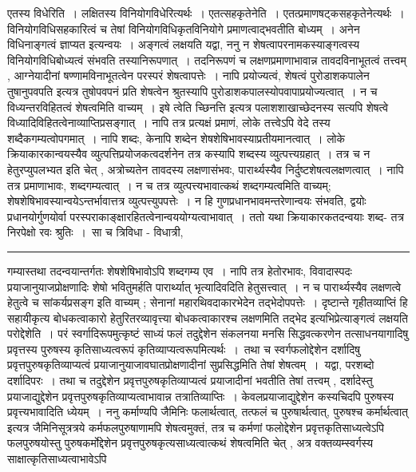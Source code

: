 \documentclass[11pt, openany]{book}
\begin{document}
 {\br एतस्य विधेरिति~।}  लक्षितस्य विनियोगविधेरित्यर्थः~। {\br एतत्सहकृतेनेति~।}  एतत्प्रमाणषट्कसहकृतेनेत्यर्थः~। विनियोगविधिसहकारित्वं च तेषां
विनियोगविधिकृतविनियोगे प्रमाणत्वाद्भवतीति बोध्यम्~। अनेन विधिनाङ्गत्वं ज्ञाप्यत इत्यन्वयः~। अङ्गत्वं लक्षयति  यद्वा,
{\br ननु} न शेषत्वापरनामकस्याङ्गत्वस्य विनियोगविधिबोध्यत्वं संभवति तस्यानिरूपणात्~। तदनिरूपणं च लक्षणप्रमाणाभावान्न तावदविनाभूतत्वं तत्त्वम् , आग्नेयादीनां षण्णामविनाभूतत्वेन परस्परं शेषत्वापत्तेः~। नापि प्रयोज्यत्वं, शेषत्वं {\qt पुरोडाशकपालेन तुषानुपवपति} इत्यत्र तुषोपवपनं प्रति शेषत्वेन श्रुतस्यापि पुरोडाशकपालस्योपवापाप्रयोज्यत्वात्~। न च विध्यन्तरविहितत्वं शेषत्वमिति वाच्यम्~। {\qt इषे त्वेति च्छिनत्ति} इत्यत्र पलाशशाखाच्छेदनस्य सत्यपि शेषत्वे विध्यादिविहितत्वेनाव्याप्तिप्रसङ्गात्~। नापि तत्र प्रत्यक्षं प्रमाणं, लोके तत्त्वेऽपि वेदे तस्य शब्दैकगम्यत्वोपगमात्~। नापि शब्दः, केनापि शब्देन शेषशेषिभावस्याप्रतीयमानत्वात्~। लोके क्रियाकारकान्वयस्यैव व्युत्पत्तिप्रयोजकत्वदर्शनेन तत्र कस्यापि शब्दस्य व्युत्पत्त्यग्रहात्~। तत्र च न हेतुरप्युपलभ्यत इति चेत् , अत्रोच्यते\textendash न तावदस्य लक्षणासंभवः, पारार्थ्यस्यैव निर्दुष्टशेषत्वलक्षणत्वात्~। नापि तत्र प्रमाणाभावः, शब्दगम्यत्वात्~। न च तत्र व्युत्पत्त्यभावात्कथं शब्दगम्यत्वमिति वाच्यम्; शेषशेषिभावस्यान्वयेऽन्तर्भावात्तत्र व्युत्पत्त्युपपत्तेः~। न हि गुणप्रधानभावमन्तरेणान्वयः संभवति, द्वयोः प्रधानयोर्गुणयोर्वा
परस्पराकाङ्क्षारहितत्वेनान्वययोग्यत्वाभावात्~। ततो यथा क्रियाकारकतदन्वयाः शब्द- 
\newpage
\fancyhead[LO]{षट्प्रमाणानि ]}
{\bl
तत्र {\al निरपेक्षो रवः श्रुतिः~}।~सा च त्रिविधा - {\al विधात्री,}}\\
\hrule
\vspace{3mm}
\noindent
गम्यास्तथा तदन्वयान्तर्गतः शेषशेषिभावोऽपि शब्दगम्य एव~। नापि तत्र हेतोरभावः, विवादास्पदः प्रयाजानुयाजप्रोक्षणादिः शेषो भवितुमर्हति पारार्थ्यात् भृत्यादिवदिति हेतुसत्त्वात्~। न च पारार्थ्यस्यैव लक्षणत्वे हेतुत्वे च सांकर्यप्रसङ्ग इति वाच्यम् ; सेनानां महारथिवदाकारभेदेन तद्भेदोपपत्तेः~। दृष्टान्ते गृहीतव्याप्तिं हि सहायीकृत्य बोधकत्वाकारो हेतुरितरव्यावृत्त्या बोधकत्वाकारश्च लक्षणमिति तद्भेद इत्यभिप्रेत्याङ्गत्वं लक्षयति {\br परोद्देशेति~।}  परं स्वर्गादिरूपमुत्कृष्टं साध्यं फलं तदुद्देशेन संकलनया मनसि सिद्धवत्करणेन तत्साधनयागादिषु प्रवृत्तस्य पुरुषस्य कृतिसाध्यत्वरूपं कृतिव्याप्यत्वरूपमित्यर्थः~।~तथा च स्वर्गफलोद्देशेन दर्शादिषु प्रवृत्तपुरुषकृतिव्याप्यत्वं प्रयाजानुयाजावघातप्रोक्षणादीनां सुप्रसिद्धमिति तेषां शेषत्वम्~।~यद्वा, {\qt पर}शब्दो दर्शादिपरः~। तथा च तदुद्देशेन प्रवृत्तपुरुषकृतिव्याप्यत्वं प्रयाजादीनां भवतीति तेषां
तत्त्वम् , दर्शादेस्तु प्रयाजाद्युद्देशेन प्रवृत्तपुरुषकृतिव्याप्यत्वाभावान्न तत्रातिव्याप्तिः~। केवलप्रयाजाद्युद्देशेन कस्यचिदपि पुरुषस्य प्रवृत्त्यभावादिति ध्येयम्~। {\br ननु} {\qt कर्माण्यपि जैमिनिः फलार्थत्वात्, तत्फलं च पुरुषार्थत्वात्, पुरुषश्च कर्मार्थत्वात्} इत्यत्र जैमिनिसूत्रत्रये कर्मफलपुरुषाणामपि शेषत्वमुक्तं, तत्र च कर्मणां फलोद्देशेन प्रवृत्तकृतिसाध्यत्वेऽपि फलपुरुषयोस्तु पुरुषकर्मोद्देशेन प्रवृत्तपुरुषकृत्यसाध्यत्वात्कथं शेषत्वमिति चेत् , अत्र वक्तव्यम्\textendash स्वर्गस्य साक्षात्कृतिसाध्यत्वाभावेऽपि
\end{document}
